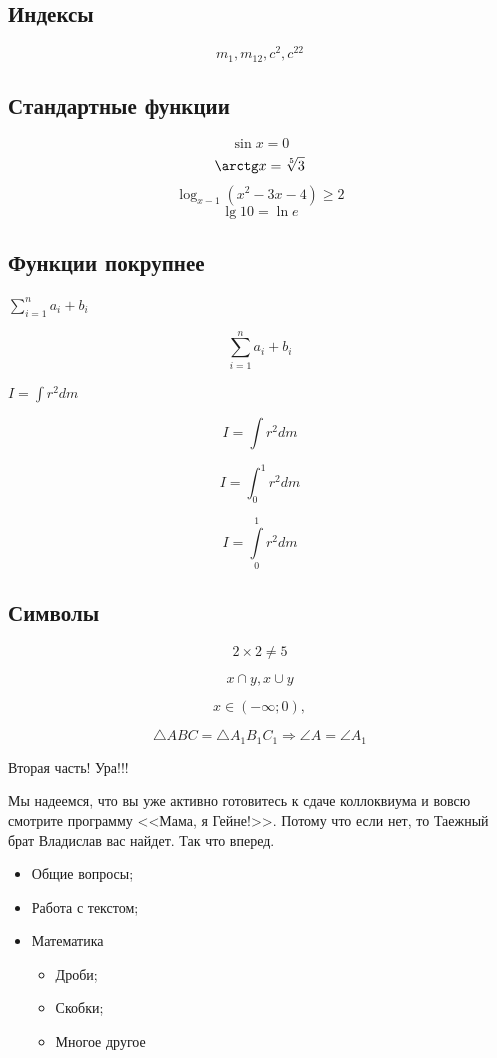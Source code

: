 \documentclass[a4paper,12pt]{article} %
\begin{document}
\subsection{Индексы}

\[ m_1, m_{12}, c^2, c^{22} \]

\subsection{Стандартные функции}

\[ \sin x=0 \]
\[ \arctg x=\sqrt[5]{3} \]
\[ \log_{x-1}{(x^2-3x-4)}\geqslant 2 \]
\[ \lg 10=\ln e \]

\subsection{Функции покрупнее}

$\sum_{i=1}^{n}a_i+b_i$

\[ \sum_{i=1}^{n}a_i+b_i \]

$I=\int r^2dm$

\[I=\int r^2dm \]

\[I=\int_{0}^{1} r^2dm \]

\[I=\int\limits_{0}^{1} r^2dm \]

\subsection{Символы}

\[2\times 2\neq 5 \]

\[x \cap y,  x \cup y\]

\[x\in (-\infty; 0),\]

\[ \triangle ABC = \triangle A_1B_1C_1 \Rightarrow \angle A= \angle A_1\]

\smiley


\newpage

\begin{center}
Вторая часть! Ура!!!
\end{center}

\begin{flushright}
Мы надеемся, что вы уже активно готовитесь к сдаче коллоквиума и вовсю смотрите программу <<Мама, я Гейне!>>. Потому что если нет, то Таежный брат Владислав вас найдет. Так что вперед.
\end{flushright}

\begin{itemize}
\item Общие вопросы;
\item Работа с текстом;
\item Математика
\begin{itemize}
\item Дроби;
\item Скобки;
\item Многое другое
\end{itemize}
\end{itemize}
\end{document}
